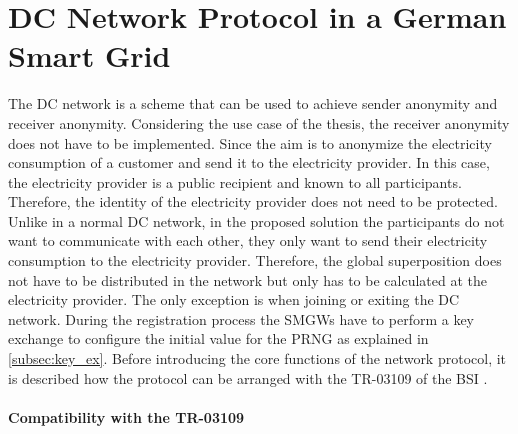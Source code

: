 \section{DC Network Protocol in a German Smart Grid}
The DC network is a scheme that can be used to achieve sender anonymity and receiver anonymity. Considering the use case of the thesis, the receiver anonymity does not have to be implemented. Since the aim is to anonymize the electricity consumption of a customer and send it to the electricity provider. In this case, the electricity provider is a public recipient and known to all participants. Therefore, the identity of the electricity provider does not need to be protected. Unlike in a normal DC network, in the proposed solution the participants do not want to communicate with each other, they only want to send their electricity consumption to the electricity provider. Therefore, the global superposition does not have to be distributed in the network but only has to be calculated at the electricity provider. The only exception is when joining or exiting the DC network.
During the registration process the \gls{SMGW}s have to perform a key exchange to configure the initial value for the PRNG as explained in \ref{subsec:key_ex}. Before introducing the core functions of the network protocol, it is described how the protocol can be arranged with the \gls{TR-03109} of the \gls{BSI} \cite{TR-031}.\\
\\
\textbf{Compatibility with the TR-03109}
\\
\\
